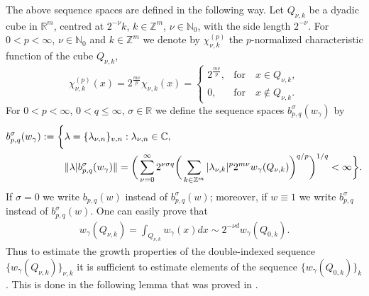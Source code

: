 \documentclass[12pt]{article}
\newcommand{\R}{{\mathbb R}}
\newcommand{\N}{{\mathbb N}}
\newcommand{\Z}{\mathbb Z}
\newcommand{\C}{{\mathbb C}}
\begin{document}
The above sequence spaces  are defined in the following way.    Let   $Q_{\nu,k}$  be a dyadic cube in $\R^m$, centred at $2^{-\nu}k$, $k\in\Z^m$, $\nu\in\N_0$,   with the side length $2^{-\nu}$.  For $0<p<\infty$, $\nu\in\N_0$ and $k\in\Z^m$ we denote by $\chi_{\nu,k}^{(p)}$ the $p$-normalized characteristic function of the cube $Q_{\nu,k}$,
\[ 
\chi_{\nu,k}^{(p)}(x)=2^{\frac{m \nu}{p}}\chi_{\nu,k}(x)=\begin{cases}
	2^{\frac{m\nu }{p}}, &\text{for} \quad x\in Q_{\nu,k},\\  
	0, &\text{for}\quad x\notin Q_{\nu,k}.  
\end{cases}
\]
For $0<p<\infty$, $0<q\leq\infty$, $\sigma\in\R$ %
we define the   sequence spaces $b_{p,q}^\sigma(w_\gamma)$  %
by
\begin{align*}
	b_{p,q}^\sigma(w_\gamma):=\biggl{\{}& \lambda=\{\lambda_{\nu,n}\}_{v,n}: \lambda_{\nu,n}\in\C,\\
	&\|\lambda|b_{p,q}^\sigma(w_\gamma)\|=
		\bigg(\sum_{\nu=0}^\infty 2^{\nu\sigma q}\bigg(\sum_{k\in\Z^m} |\lambda_{\nu,k}|^p2^{m\nu}w_\gamma(Q_{\nu,k})\bigg)^{q/p}\bigg)^{1/q} <\infty 
	\biggr{\}}.
\end{align*}
If $\sigma=0$ we write $b_{p,q}(w)$ instead of $b_{p,q}^\sigma(w)$; moreover, if $w\equiv 1$ we write $b_{p,q}^\sigma$ instead of $b_{p,q}^\sigma(w)$. One can easily prove that 
\begin{align}\label{wQ}
	w_\gamma(Q_{\nu,k}) =  \int_{Q_{\nu,k}} w_\gamma(x) dx \sim  
	2^{-\nu d} w_\gamma(Q_{0,k}) .
\end{align}
Thus to estimate the growth properties of the double-indexed sequence $\{w_\gamma(Q_{\nu,k})\}_{\nu,k}$ it is sufficient  to estimate  elements of the sequence   $\{w_\gamma(Q_{0,k})\}_{k}$. This is done in the following lemma that was proved in \cite{DS}. 
\end{document}
